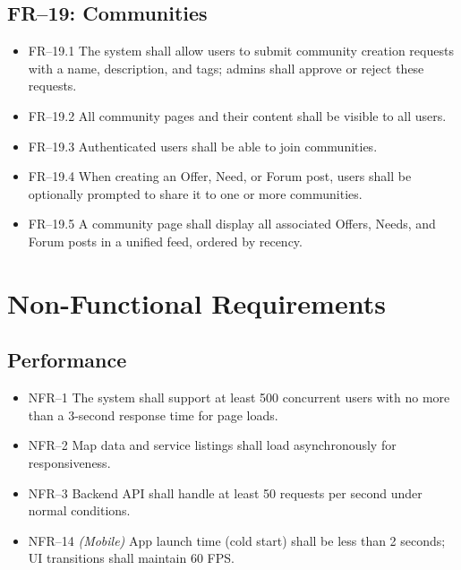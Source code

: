 \documentclass[11pt,a4paper]{report}
\begin{document}
\subsection{FR--19: Communities}
\begin{itemize}
    \item FR--19.1 The system shall allow users to submit community creation requests with a name, description, and tags; admins shall approve or reject these requests.
    \item FR--19.2 All community pages and their content shall be visible to all users.
    \item FR--19.3 Authenticated users shall be able to join communities.
    \item FR--19.4 When creating an Offer, Need, or Forum post, users shall be optionally prompted to share it to one or more communities.
    \item FR--19.5 A community page shall display all associated Offers, Needs, and Forum posts in a unified feed, ordered by recency.
\end{itemize}

\section{Non-Functional Requirements}
\label{sec:nonfunctional-requirements}

\subsection{Performance}
\begin{itemize}
    \item NFR--1 The system shall support at least 500 concurrent users with no more than a 3-second response time for page loads.
    \item NFR--2 Map data and service listings shall load asynchronously for responsiveness.
    \item NFR--3 Backend API shall handle at least 50 requests per second under normal conditions.
    \item NFR--14 \textit{(Mobile)} App launch time (cold start) shall be less than 2 seconds; UI transitions shall maintain 60 FPS.
\end{itemize}
\end{document}
